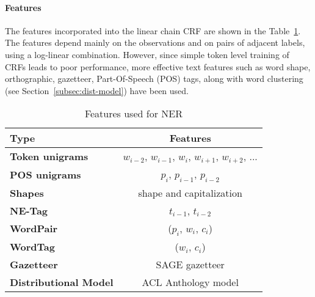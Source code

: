 \paragraph{Features}%
The  features incorporated into the linear chain CRF are shown in the Table~\ref{tab:features}. The features depend mainly on the observations  and  on  pairs  of  adjacent  labels, using a log-linear  combination. However, since simple token level training of CRFs leads to poor performance, more effective text features such as word shape, orthographic, gazetteer, Part-Of-Speech (POS) tags, along with word clustering (see Section~\ref{subsec:dist-model}) have been used.
%
\begin{table}
\small
  \caption{Features used for NER}
  \label{tab:features}
  \center
  \begin{tabular}{lc}
    \toprule
  \textbf{Type} &  \textbf{Features} \\
    \midrule
\textbf{Token unigrams} 	   &    $w_{i-2}$, $w_{i-1}$, $w_{i}$, $w_{i+1}$, $w_{i+2}$, ... \\

\textbf{POS unigrams} 	   &    $p_{i}$, $p_{i-1}$, $p_{i-2}$ \\

\textbf{Shapes}	   &    shape and capitalization \\
    \midrule
\textbf{NE-Tag}	   &    $t_{i-1}$, $t_{i-2}$ \\
      \midrule
\textbf{WordPair}	 &   
($p_{i}$, $w_{i}$, $c_{i}$) \\

\textbf{WordTag}	 &   
($w_{i}$, $c_{i}$) \\

    \midrule
\textbf{Gazetteer}	   &    SAGE gazetteer \\
    \midrule
    \textbf{Distributional Model}	   &    ACL Anthology model \\
      \bottomrule
   \end{tabular}
\end{table}

